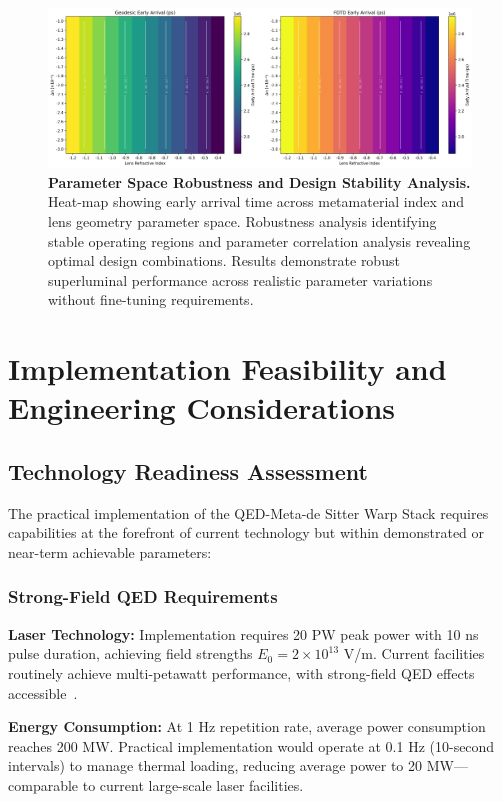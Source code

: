 \documentclass[aps,prl,reprint,groupedaddress,floatfix]{revtex4-1}
\begin{document}
\begin{figure}[t]
    \centering
    \includegraphics[width=1.0\textwidth]{parameter_sweep_heatmap.png}
    \caption{\textbf{Parameter Space Robustness and Design Stability Analysis.} Heat-map showing early arrival time across metamaterial index and lens geometry parameter space. Robustness analysis identifying stable operating regions and parameter correlation analysis revealing optimal design combinations. Results demonstrate robust superluminal performance across realistic parameter variations without fine-tuning requirements.}
    \label{fig:parameter_robustness}
\end{figure}

\section{Implementation Feasibility and Engineering Considerations}

\subsection{Technology Readiness Assessment}

The practical implementation of the QED-Meta-de Sitter Warp Stack requires capabilities at the forefront of current technology but within demonstrated or near-term achievable parameters:

\subsubsection{Strong-Field QED Requirements}

\textbf{Laser Technology:} Implementation requires 20 PW peak power with 10 ns pulse duration, achieving field strengths $E_0 = 2 \times 10^{13}$ V/m. Current facilities routinely achieve multi-petawatt performance, with strong-field QED effects accessible~\cite{DellaValle2016}.

\textbf{Energy Consumption:} At 1 Hz repetition rate, average power consumption reaches 200 MW. Practical implementation would operate at 0.1 Hz (10-second intervals) to manage thermal loading, reducing average power to 20 MW—comparable to current large-scale laser facilities.
\end{document}
